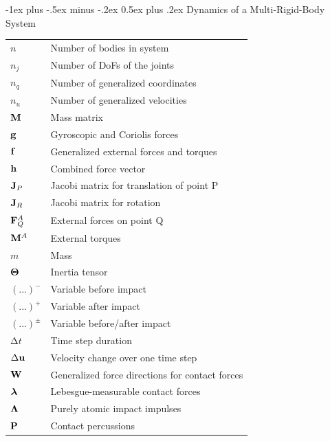 \documentclass[10pt,landscape,a4paper]{article}
\makeatletter
\renewcommand{\section}{\@startsection{section}{1}{0mm}%
                               {-1ex plus -.5ex minus -.2ex}%
                                {0.5ex plus .2ex}%
                                {\normalfont\large\bfseries}}
\makeatother
\begin{document}
\begin{multicols}{2}
\newpage
\section{Dynamics of a Multi-Rigid-Body System}

\begin{tabular}{@{}ll@{}}
  $n$			& Number of bodies in system \\
  $n_j$ 		& Number of DoFs of the joints \\
  $n_q$ 		& Number of generalized coordinates \\
  $n_u$ 		& Number of generalized velocities \\
  $\mathbf M$			& Mass matrix \\
  $\mathbf g$			& Gyroscopic and Coriolis forces \\
  $\mathbf f$			& Generalized external forces and torques \\
  $\mathbf h$			& Combined force vector \\
  $\mathbf J_P$		& Jacobi matrix for translation of point P \\
  $\mathbf J_{R}$		& Jacobi matrix for rotation \\
  $\mathbf F_Q^A$		& External forces on point Q \\
  $\mathbf M^A$		& External torques \\
  $m$ 			& Mass \\
  $\mathbf \Theta$ 		& Inertia tensor \\
  $(...)^-$		& Variable before impact \\
  $(...)^+$		& Variable after impact \\
  $(...)^\pm$		& Variable before/after impact \\
  $\mathrm{\Delta} t$	& Time step duration \\
  $\mathrm{\Delta} \mathbf u$	& Velocity change over one time step \\
  $\mathbf W$			& Generalized force directions for contact forces \\
  $\mbox{\boldmath $\lambda$}$		& Lebesgue-measurable contact forces \\
  $\mathbf \Lambda$		& Purely atomic impact impulses \\
  $\mathbf P$			& Contact percussions \\
\end{tabular}



\end{multicols}
\end{document}
